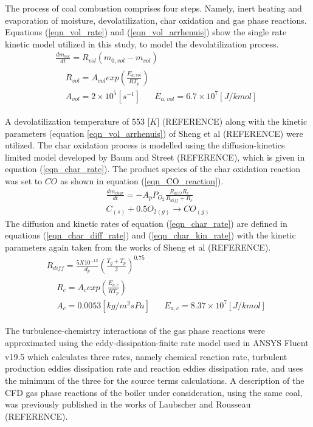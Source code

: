 \documentclass[review]{elsarticle}
\begin{document}
The process of coal combustion comprises four steps. Namely, inert heating and evaporation of moisture, devolatilization, char oxidation and gas phase reactions. Equations (\ref{eqn_vol_rate}) and (\ref{eqn_vol_arrhenuis}) show the single rate kinetic model utilized in this study, to model the devolatilization process.
\begin{gather}
\frac{dm_{vol}}{dt} = R_{vol}(m_{0,vol}-m_{vol}) \label{eqn_vol_rate} \\
\begin{split}
&R_{vol} = A_{vol}exp\left(\frac{E_{a,vol}}{RT_p}\right)\\
&A_{vol} = 2\times10^5 [s^{-1}]\,\,\,\,\,\,\,\,\,\,E_{a,vol} = 6.7\times10^7 [J/kmol] \label{eqn_vol_arrhenuis}
\end{split}
\end{gather}

A devolatilization temperature of 553 [$K$] (REFERENCE) along with the kinetic parameters (equation \ref{eqn_vol_arrhenuis}) of Sheng et al (REFERENCE) were utilized. The char oxidation process is modelled using the diffusion-kinetics limited model developed by Baum and Street (REFERENCE), which is given in equation (\ref{eqn_char_rate}). The product species of the char oxidation reaction was set to $CO$ as shown in equation (\ref{eqn_CO_reaction}). 
\begin{gather}
\frac{dm_{char}}{dt} = -A_p P_{O_{2}} \frac{R_{diff}R_c}{R_{diff} + R_c}  \label{eqn_char_rate}\\
C_{(s)}+0.5O_{2(g)}\to CO_{(g)} \label{eqn_CO_reaction}
\end{gather}
The diffusion and kinetic rates of equation (\ref{eqn_char_rate}) are defined in equations (\ref{eqn_char_diff_rate})  and (\ref{eqn_char_kin_rate}) with the kinetic parameters again taken from the works of Sheng et al (REFERENCE).
\begin{gather}
R_{diff} = \frac{5X10^{-12}}{d_p} \left(\frac{T_g+T_p}{2}\right)^0.75 \label{eqn_char_diff_rate}\\
\begin{split}
&R_{c} = A_{c}exp\left(\frac{E_{a,c}}{RT_p}\right)\\
&A_{c} = 0.0053 [kg/m^2sPa]\,\,\,\,\,\,\,\,\,\,E_{a,c} = 8.37\times10^7 [J/kmol]
\end{split}
 \label{eqn_char_kin_rate}
\end{gather}

The turbulence-chemistry interactions of the gas phase reactions were approximated using the eddy-dissipation-finite rate model used in ANSYS Fluent v19.5\textsuperscript{\textregistered} which calculates three rates, namely chemical reaction rate, turbulent production eddies dissipation rate and reaction eddies dissipation rate, and uses the minimum of the three for the source terms calculations. A description of the CFD gas phase reactions of the boiler under consideration, using the same coal, was previously published in the works of Laubscher and Rousseau (REFERENCE).
\end{document}
